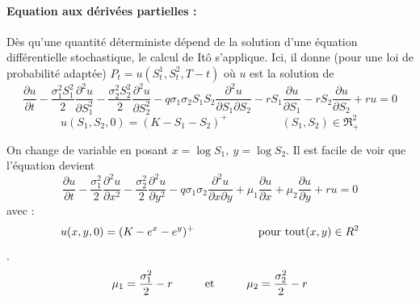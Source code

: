 \documentclass{book}
\begin{document}
\paragraph{Equation aux d{\'e}riv{\'e}es partielles : }
D{\`e}s qu'une quantit{\'e} d{\'e}terministe d{\'e}pend de la solution d'une {\'e}quation diff{\'e}rentielle stochastique, le calcul de It{\^o} s'applique. Ici, il donne (pour une loi de probabilit{\'e} adapt{\'e}e)
$P_t = u(S^1_t, S^2_t,T-t)$  o{\`u} $u$ est la solution de
\[
\frac{\partial u}{\partial t} - \frac{\sigma_1^2 S_1^2}2\frac{\partial^2 u}{\partial S_1^2}
                    - \frac{\sigma_2^2 S_2^2}2\frac{\partial^2 u}{\partial S_2^2}
                    - q\sigma_1\sigma_2 S_1 S_2\frac{\partial^2 u}{\partial S_1\partial S_2}
                 -r S_1\frac{\partial u}{\partial S_1}-r S_2\frac{\partial u}{\partial S_2} +r u =0
\]
\[
u(S_{1},S_{2},0)=(K-S_{1}-S_{2})^{+}  \hspace{2cm} (S_{1},S_{2})\in \Re_{+}^{2}
\] 

On change de variable en posant $x=\log S_1, ~ y=\log S_2$.  Il est facile  de voir que l'{\'e}quation devient
\[
\frac{\partial u}{\partial t} - \frac{\sigma_1^2}2\frac{\partial^2 u}{\partial x^2}
                    - \frac{\sigma_2^2}2\frac{\partial^2 u}{\partial y^2}
                    - q\sigma_1\sigma_2\frac{\partial^2 u}{\partial x\partial y} +
                 \mu_1\frac{\partial u}{\partial x} + \mu_2 \frac{\partial u}{\partial y}+r u =0
\]
avec :
\[u(x,y,0)=(K-e^{x}-e^{y})^{+} \hspace{2cm} \hbox{pour tout} (x,y)\in R^{2}\].
\[\mu_{1}=\frac{\sigma_{1}^{2}}{2}-r \hspace{1cm} \hbox{et} \hspace{1cm} \mu_{2}=\frac{\sigma_{2}^{2}}{2}-r\]
\end{document}
